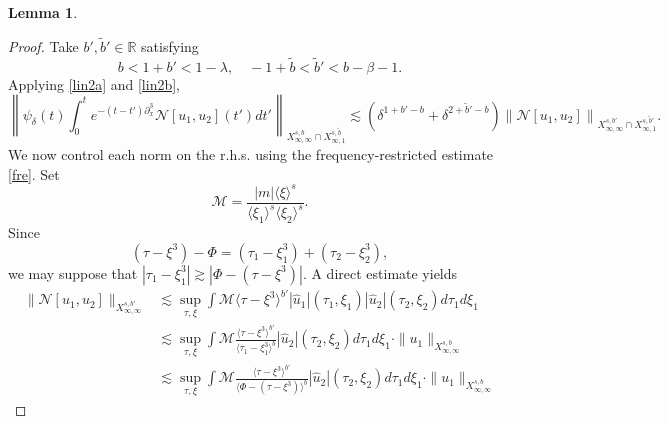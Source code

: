 \documentclass[%
11pt,  reqno]{amsart}
\newcommand{\jap}[1]{\langle #1 \rangle}
\newcommand{\5}{\textup{V}}
\newcommand{\les}{\lesssim}
\newcommand{\wt}{\widetilde}
\newtheorem{lemma}[theorem]{Lemma}
\theoremstyle{remark}
\newtheorem{remark}[theorem]{Remark}
\newcommand{\R}{\mathbb{R}}
\numberwithin{equation}{section}
\numberwithin{theorem}{section}
\newcommand{\Ncal}{\mathcal{N}}
\begin{document}
{\begin{lemma}
		\end{lemma}
		\begin{proof}
Take $b', \tilde{b}'\in \R$ satisfying
			$$
			 b < 1+b'< 1-\lambda,\quad -1+\wt{b}<\wt{b}'<b-\beta-1.
$$
        Applying \eqref{lin2a} and \eqref{lin2b},
        $$
        \left\|\psi_\delta(t)\int_0^t e^{-(t-t')\partial_x^3}\Ncal[u_1,u_2](t')dt' \right\|_{X^{s,b}_{\infty, \infty} \cap X^{s,\tilde{b}}_{\infty,1}}  \lesssim (\delta^{1+b'-b} + \delta^{2+\tilde{b}'-b})\left\|\Ncal[u_1,u_2] \right\|_{X^{s,b'}_{\infty, \infty} \cap X^{s,\tilde{b}'}_{\infty,1}}.
        $$
        We now control each norm on the r.h.s. using the frequency-restricted estimate \eqref{fre}.
			Set
			$$
			\mathcal{M}=\frac{|m|\jap{\xi}^s}{\jap{\xi_1}^s\jap{\xi_2}^s}.
			$$
            Since 
            $$(\tau-\xi^3) - \Phi =  (\tau_1-\xi_1^3) + (\tau_2-\xi_2^3),
            $$
            we may suppose that $|\tau_1-\xi_1^3|\gtrsim |\Phi-(\tau-\xi^3)|$.
			A direct estimate yields
			\begin{align}
				\|\Ncal[u_1,u_2] \|_{X^{s,b'}_{\infty, \infty}} &\lesssim \sup_{\tau,\xi} \int \mathcal{M}\jap{\tau-\xi^3}^{b'}|\hat{u}_1|(\tau_1,\xi_1) |\hat{u}_2|(\tau_2,\xi_2)d\tau_1 d\xi_1 \\& \lesssim \sup_{\tau,\xi} \int \mathcal{M}\frac{\jap{\tau-\xi^3}^{b'}}{\jap{\tau_1-\xi_1^3}^b  } |\hat{u}_2|(\tau_2,\xi_2)d\tau_1d\xi_1 \cdot  \|u_1\|_{X^{s,b}_{\infty,\infty}}\\& \lesssim \sup_{\tau,\xi} \int \mathcal{M}\frac{\jap{\tau-\xi^3}^{b'}}{\jap{\Phi-(\tau-\xi^3)}^b  } |\hat{u}_2|(\tau_2,\xi_2)d\tau_1d\xi_1 \cdot  \|u_1\|_{X^{s,b}_{\infty,\infty}}

\end{align}
\end{proof}}
\end{document}
